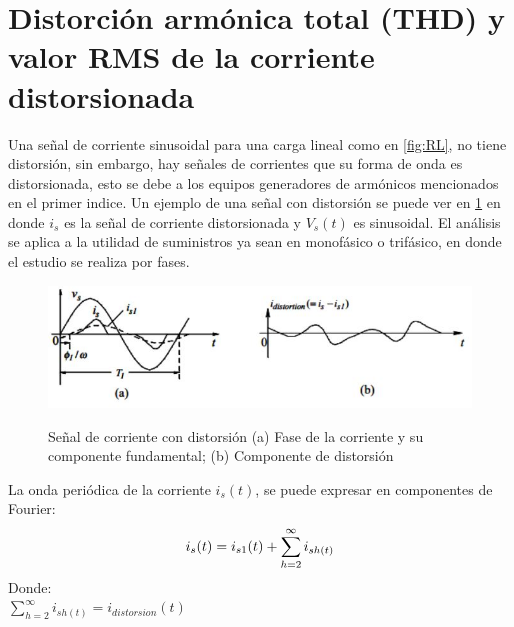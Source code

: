 

\section{Distorción armónica total (THD) y valor RMS de la corriente distorsionada}


Una señal de corriente sinusoidal para una carga lineal como en \ref{fig:RL}, no tiene distorsión, sin embargo, hay señales de corrientes que su forma de onda es distorsionada, esto se debe a los equipos generadores de armónicos mencionados en el primer indice. \cite{A29} Un ejemplo de una señal con distorsión se puede ver en \ref{fig:distorsion_current} en donde $i_{s}$ es la señal de corriente distorsionada y $V_{s}(t)$ es sinusoidal. El análisis se aplica a la utilidad de suministros ya sean en monofásico o trifásico, en donde el estudio se realiza por fases.\\
  
\begin{figure}[H]
\centering
\includegraphics{2Marco/distorsin}
\caption{ Señal de corriente con distorsión (a) Fase de la corriente y su componente fundamental; (b) Componente de distorsión} \cite{A29} 
\label{fig:distorsion_current}
\end{figure} 



La onda periódica de la corriente $i_{s}(t)$, se puede expresar en componentes de Fourier:\\
\begin{equation}\label{EQ4}
i_{s}(t)=i_{s1}(t) + \sum_{h=2}^{\infty}i_{sh(t)}\\
\end{equation}
Donde:\\
$\sum_{h=2}^{\infty}i_{sh(t)} = i_{distorsion}(t)$\\

